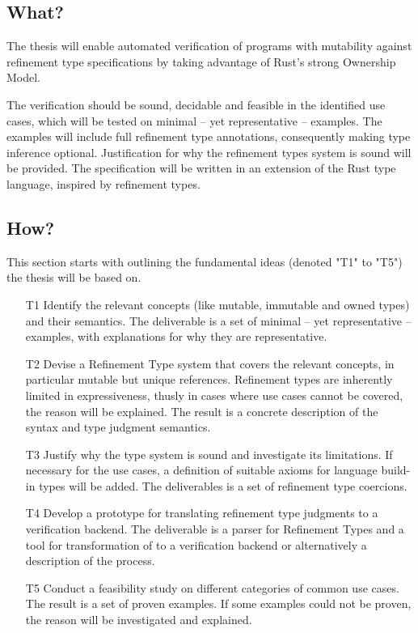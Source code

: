 \documentclass[11pt]{article}
\begin{document}


\subsection{What?}

The thesis will enable automated verification of programs with mutability against refinement type specifications by taking advantage of Rust's strong Ownership Model.

The verification should be sound, decidable and feasible in the identified use cases, which will be tested on minimal -- yet representative -- examples. The examples will include full refinement type annotations, consequently making type inference optional.
Justification for why the refinement types system is sound will be provided.
The specification will be written in an extension of the Rust type language, inspired by refinement types.

\subsection{How?} \label{ssec:How}

This section starts with outlining the fundamental ideas (denoted "T1" to "T5") the thesis will be based on.

\begin{itemize}
	\item[T1] Identify the relevant concepts (like mutable, immutable and owned types) and their semantics. The deliverable is a set of minimal -- yet representative -- examples, with explanations for why they are representative.
	\item[T2] Devise a Refinement Type system that covers the relevant concepts, in particular mutable but unique references. Refinement types are inherently limited in expressiveness, thusly in cases where use cases cannot be covered, the reason will be explained. The result is a concrete description of the syntax and type judgment semantics.
	\item[T3] Justify why the type system is sound and investigate its limitations. If necessary for the use cases, a definition of suitable axioms for language build-in types will be added. The deliverables is a set of refinement type coercions.
	\item[T4] Develop a prototype for translating refinement type judgments to a verification backend. The deliverable is a parser for Refinement Types and a tool for transformation of to a verification backend or alternatively a description of the process.
	\item[T5] Conduct a feasibility study on different categories of common use cases. The result is a set of proven examples. If some examples could not be proven, the reason will be investigated and explained.
\end{itemize}
\end{document}
